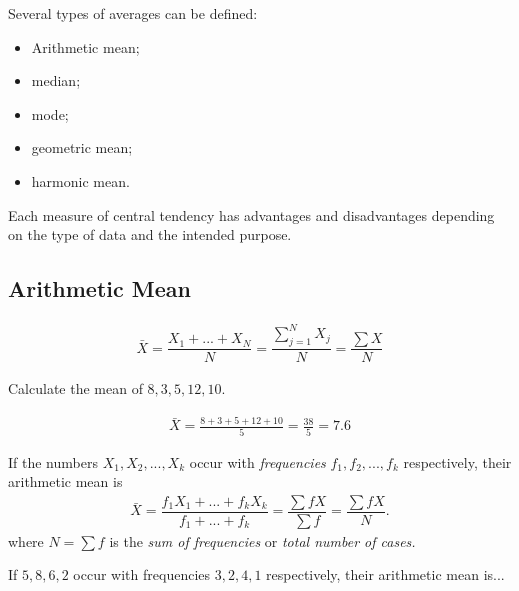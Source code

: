Several types of averages can be defined: 
\begin{itemize}
	\item Arithmetic mean;
	\item median;
	\item mode;
	\item geometric mean;
	\item harmonic mean.
\end{itemize}



\begin{remark}
	Each measure of central tendency has advantages and disadvantages depending on the type of data and the intended purpose.
\end{remark}


\subsection{Arithmetic Mean}

\begin{definition}
	\begin{align}
		\label{eq:1.2.1}
		\bar{X} =\dfrac{X_{1}+...+X_{N}}{N} = \dfrac{\sum_{j=1}^{N}X_{j}}{N}=\dfrac{\sum X}{N}
	\end{align}
\end{definition}



\begin{example}
	Calculate the mean of $8,3,5,12,10$.
\end{example}

\begin{solution}
	\begin{align}
		\bar{X} = \frac{8+3+5+12+10}{5} = \frac{38}{5} = 7.6
	\end{align}
\end{solution}




If the numbers $X_{1},X_{2},...,X_{k}$ occur with \emph{frequencies} $f_{1}, f_{2},...,f_{k}$ respectively, their arithmetic mean is
\begin{align}
	\label{eq:1.2.2}
	\bar{X}=\dfrac{f_{1}X_{1}+...+f_{k}X_{k}}{f_{1}+...+f_{k}}=\dfrac{\sum fX}{\sum f}=\dfrac{\sum fX}{N}.
\end{align}
where $N=\sum f$ is the \emph{sum of frequencies} or \emph{total number of cases.}


\begin{example}
	If $5,8,6,2$ occur with frequencies $3,2,4,1$ respectively, their arithmetic mean is...
\end{example}


